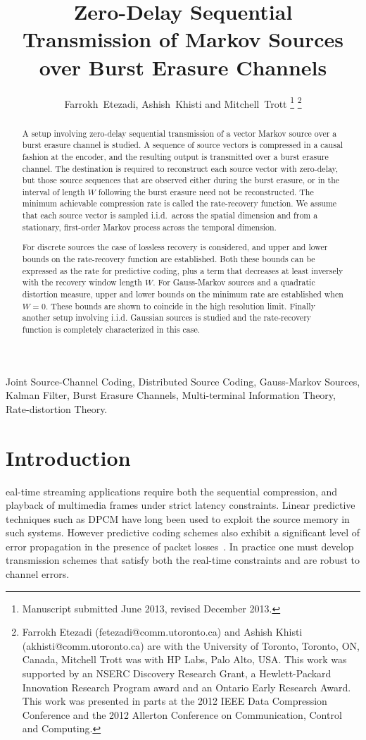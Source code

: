\documentclass[journal, twocolumn, 10pt]{IEEEtran}
\author{{Farrokh~Etezadi,  Ashish~Khisti and Mitchell~Trott}
\thanks{Manuscript submitted June 2013, revised December 2013.}
\thanks{Farrokh Etezadi (fetezadi@comm.utoronto.ca) and Ashish Khisti ({akhisti@comm.utoronto.ca}) are with the University of Toronto, Toronto, ON, Canada, Mitchell Trott was with HP Labs, Palo Alto, USA. 
This work was supported by an NSERC Discovery Research Grant, a Hewlett-Packard Innovation Research Program award and an Ontario Early Research Award. This work was presented in parts at the 2012 IEEE Data Compression Conference and the 2012 Allerton Conference on Communication, Control and Computing. }}
\title{Zero-Delay Sequential Transmission of Markov Sources over Burst Erasure Channels}
\begin{document}
 
\maketitle

\begin{abstract}
A setup involving zero-delay sequential transmission of a vector Markov source over a burst erasure channel  is studied.  A sequence of source vectors is compressed in a causal fashion at the encoder,  and the resulting output is transmitted over a burst erasure channel.  The destination is required to reconstruct each source vector with zero-delay, but those source sequences that are observed either during the burst erasure, or in the interval of length $W$ following the burst erasure need not be reconstructed.   The minimum achievable compression rate is called the rate-recovery function.   We assume that each source vector is sampled  i.i.d.\ across the spatial dimension and from a stationary, first-order Markov process across the temporal dimension. 

For discrete sources the case of lossless recovery is considered, and upper and lower bounds on the rate-recovery function are established. Both these bounds can be expressed as the rate for predictive coding, plus a term that decreases at least inversely with the recovery window length $W$. For Gauss-Markov sources and a quadratic distortion measure, upper and lower bounds on the minimum rate are established when $W=0$. These bounds are shown to coincide in the high resolution limit.  Finally another setup involving  i.i.d. Gaussian sources is studied and the rate-recovery function is completely characterized in this case.

\end{abstract}
\begin{keywords}
Joint Source-Channel Coding, Distributed Source Coding, Gauss-Markov Sources, Kalman Filter, Burst Erasure Channels, Multi-terminal Information Theory, Rate-distortion Theory.
\end{keywords}


%


\section{Introduction}

eal-time streaming applications require both the sequential compression, and playback of multimedia frames under strict latency constraints.  Linear predictive techniques such as DPCM have long been used to exploit the source memory in such systems. However predictive coding  schemes also exhibit a significant level of error propagation in the presence of packet losses~\cite{wang2000error}.   In practice one must develop transmission schemes that satisfy both the real-time constraints and are robust to channel errors.  
\end{document}
